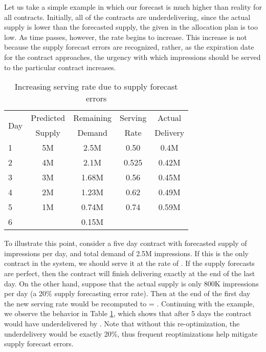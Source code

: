Let us take a simple example in which our forecast is much higher
than reality for all contracts. Initially, all of the contracts are
underdelivering, since the actual supply is lower than the
forecasted supply, the  given in the allocation plan is too
low. As time passes, however, the rate begins to increase. This
increase is not because the supply forecast errors are recognized,
rather, as the expiration date for the contract approaches, the
urgency with which impressions should be served to the particular
contract increases.


\begin{table}[t]
\begin{center}
\caption{Increasing serving rate due to supply forecast errors}
\vspace{2pt}
{\begin{tabular}{|l|c|c|c|c|}
\hline
\multirow{2}{*}{Day} & Predicted & Remaining & Serving & Actual \\ & Supply & Demand & Rate & Delivery \\
\hline
1 & 5M & 2.5M & 0.50 & 0.4M \\
2 & 4M &    2.1M &  0.525 &     0.42M \\
3 & 3M & 1.68M &    0.56 &  0.45M \\
4 & 2M &    1.23M & 0.62 &  0.49M \\
5 & 1M & 0.74M &    0.74 &  0.59M\\
6 & &   0.15M & &  \\
\hline
\end{tabular}}
\label{tab:reopt}
\end{center}
\end{table}

To illustrate this point, consider a five day contract  with forecasted supply of  impressions per day, and
total demand of 2.5M impressions. If this is the only contract in the system, we should serve it at the rate of
. If the supply forecasts are perfect, then the contract will finish delivering exactly at the end of the last day. On the other hand, suppose that the actual supply is only 800K impressions per day (a 20\% supply forecasting error rate).  Then at the end of the first day the new serving rate would be recomputed to = .  Continuing with the example, we observe the behavior in Table \ref{tab:reopt}, which shows that after 5 days the contract would have underdelivered by .  Note that without this re-optimization, the underdelivery would be exactly 20\%, thus frequent reoptimizations help mitigate supply forecast errors.

